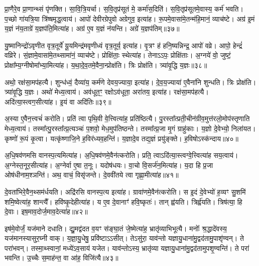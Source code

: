 प्रा॒णैरे॒व प्रा॒णान्थ्सं पृ॑णक्ति।
सा॒वि॒त्रि॒यर्चा।
स॒वि॒तृप्र॑सूतं मे॒ कर्मा॑स॒दिति॑।
स॒वि॒तृप्र॑सूतमे॒वास्य॒ कर्म॑ भवति।
प॒च्छो गा॑यत्रि॒या त्रि॑ष्षमृद्ध॒त्वाय॑।
आपो॑ देवीरग्रेपुवो अग्रेगुव॒ इत्या॑ह।
रू॒पमे॒वासा॑मे॒तन्म॑हि॒मानं॒ व्याच॑ष्टे।
अग्र॑ इ॒मं य॒ज्ञं न॑य॒ताग्रे॑ य॒ज्ञप॑ति॒मित्या॑ह।
अग्र॑ ए॒व य॒ज्ञं न॑यन्ति।
अग्रे॑ य॒ज्ञप॑तिम्॥३७॥\ip

यु॒ष्मानिन्द्रो॑\-ऽवृणीत वृत्र॒तूर्ये॑ यू॒यमिन्द्र॑मवृणीध्वं वृत्र॒तूर्य॒ इत्या॑ह।
वृ॒त्रꣳ ह॑ हनि॒ष्यन्निन्द्र॒ आपो॑ वव्रे।
आपो॒ हेन्द्रं॑ वव्रिरे।
सं॒ज्ञामे॒वासा॑मे॒तथ्सामा॑नं॒ व्याच॑ष्टे।
प्रोक्षि॑ताः॒ स्थेत्या॑ह।
तेनाऽऽपः॒ प्रोक्षि॑ताः।
अ॒ग्नये॑ वो॒ जुष्टं॒ प्रोक्षा᳚म्य॒ग्नीषोमा᳚भ्या॒मित्या॑ह।
य॒था॒दे॒व॒तमे॒वैना॒न्प्रोक्ष॑ति।
त्रिः प्रोक्ष॑ति।
त्र्या॑वृ॒द्धि य॒ज्ञः॥३८॥\ip

अथो॒ रक्ष॑सा॒मप॑हत्यै।
शुन्ध॑ध्वं॒ दैव्या॑य॒ कर्म॑णे देवय॒ज्याया॒ इत्या॑ह।
दे॒व॒य॒ज्याया॑ ए॒वैना॑नि शुन्धति।
त्रिः प्रोक्ष॑ति।
त्र्या॑वृ॒द्धि य॒ज्ञः।
अथो॑ मेध्य॒त्वाय॑।
अव॑धूत॒ꣳ॒ रक्षो\-ऽव॑धूता॒ अरा॑तय॒ इत्या॑ह।
रक्ष॑सा॒मप॑हत्यै।
अदि॑त्या॒स्त्वग॒सीत्या॑ह।
इ॒यं वा अदि॑तिः॥३९॥\ip

अ॒स्या ए॒वैन॒त्त्वचं॑ करोति।
प्रति॑ त्वा पृथि॒वी वे॒त्त्वित्या॑ह॒ प्रति॑\-ष्ठित्यै।
पु॒रस्ता᳚त्प्रती॒चीन॑\-ग्रीव॒\-मुत्त॑रलो॒मोप॑स्तृणाति मेध्य॒त्वाय॑।
तस्मा᳚त्पु॒रस्ता᳚त्प्र॒त्यञ्चः॑ प॒शवो॒ मेध॒मुप॑तिष्ठन्ते।
तस्मा᳚त्प्र॒जा मृ॒गं ग्राहु॑काः।
य॒ज्ञो दे॒वेभ्यो॒ निला॑यत।
कृष्णो॑ रू॒पं कृ॒त्वा।
यत्कृ॑ष्णाजि॒ने ह॒विर॑ध्यव॒हन्ति॑।
य॒ज्ञादे॒व तद्य॒ज्ञं प्रयु॑ङ्क्ते।
ह॒विषो\-ऽस्क॑न्दाय॥४०॥\ip

अ॒धि॒षव॑णमसि वानस्प॒त्यमित्या॑ह।
अ॒धि॒षव॑ण\-मे॒वैन॑त्करोति।
प्रति॒ त्वा\-ऽदि॑त्या॒स्त्वग्वे॒त्त्वित्या॑ह सय॒त्वाय॑।
अ॒ग्नेस्त॒नूर॒सी\-त्या॑ह।
अ॒ग्नेर्वा ए॒षा त॒नूः।
यदोष॑धयः।
वा॒चो वि॒सर्ज॑न॒मित्या॑ह।
य॒दा हि प्र॒जा ओष॑धीनाम॒श्ञन्ति॑।
अथ॒ वाचं॒ विसृ॑जन्ते।
दे॒ववी॑तये त्वा गृह्णा॒मीत्या॑ह॥४१॥\ip

दे॒वता॑भिरे॒वैन॒थ्सम॑र्धयति।
अद्रि॑रसि वानस्प॒त्य इत्या॑ह।
ग्रावा॑णमे॒वैन॑त्करोति।
स इ॒दं दे॒वेभ्यो॑ ह॒व्यꣳ सु॒शमि॑ शमि॒ष्वेत्या॑ह॒ शान्त्यै᳚।
हवि॑ष्कृ॒देहीत्या॑ह।
य ए॒व दे॒वानाꣳ॑ हवि॒ष्कृतः॑।
तान्‌ ह्व॑यति।
त्रिर्ह्व॑यति।
त्रिष॑त्या॒ हि दे॒वाः।
इष॒माव॒दोर्ज॒माव॒देत्या॑ह॥४२॥\ip

इष॑मे॒वोर्जं॒ यज॑माने दधाति।
द्यु॒मद्व॑दत व॒यꣳ स॑ङ्घा॒तं जे॒ष्मेत्या॑ह॒ भ्रातृ॑व्याभिभूत्यै।
मनोः᳚ श्र॒द्धादे॑वस्य॒ यज॑मानस्या\-सुर॒घ्नी वाक्।
य॒ज्ञा॒यु॒धेषु॒ प्रवि॑ष्टा\-ऽऽसीत्।
तेऽसु॑रा॒ याव॑न्तो यज्ञायु॒धाना॑मु॒द्वद॑ता\-मु॒पा\-शृ॑ण्वन्।
ते परा॑भवन्।
तस्मा॒थ्स्वानां॒ मध्ये॑\-ऽव॒साय॑ यजेत।
याव॑न्तो\-ऽस्य॒ भ्रातृ॑व्या यज्ञायु॒धाना॑\-मु॒द्वद॑ता\-मुप\-शृ॒ण्वन्ति॑।
ते परा॑ भवन्ति।
उ॒च्चैः स॒माह॑न्त॒ वा आ॑ह॒ विजि॑त्यै॥४३॥\ip

